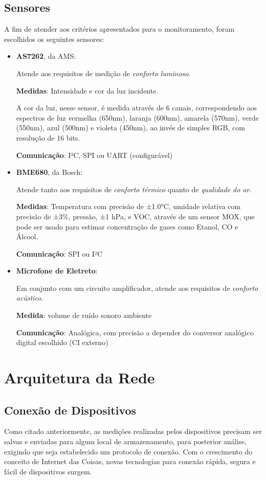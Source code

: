\documentclass[monografia.tex]{subfiles}
\begin{document}
\subsection{Sensores}
A fim de atender aos critérios apresentados para o monitoramento, foram escolhidos os seguintes sensores: 
\begin{itemize}
\item \textbf{AS7262}, da AMS: 

Atende aos requisitos de medição de \textit{conforto luminoso}. 

\textbf{Medidas}: Intensidade e cor da luz incidente.

A cor da luz, nesse sensor, é medida através de 6 canais, correspondendo aos espectros de luz vermelha (650nm), laranja (600nm), amarela (570nm), verde (550nm), azul (500nm) e violeta (450nm), ao invés de simples RGB, com resolução de 16 bits.

\textbf{Comunicação}: I²C, SPI ou UART (configurável)

\item \textbf{BME680}, da Bosch: 

Atende tanto aos requisitos de \textit{conforto térmico} quanto de \textit{qualidade do ar}.

\textbf{Medidas}: Temperatura com precisão de ±1.0°C, umidade relativa com precisão de ±3\%, pressão, ±1 hPa, e VOC, através de um sensor MOX, que pode ser usado para estimar concentração de gases como Etanol, CO e Álcool. 

\textbf{Comunicação}: SPI ou I²C

\item \textbf{Microfone de Eletreto}:

Em conjunto com um circuito amplificador, atende aos requisitos de \textit{conforto acústico}. 

\textbf{Medida}: volume de ruído sonoro ambiente

\textbf{Comunicação}: Analógica, com precisão a depender do conversor analógico digital escolhido (CI externo)
\end{itemize}

\section{Arquitetura da Rede}

\subsection{Conexão de Dispositivos}
Como citado anteriormente, as medições realizadas pelos dispositivos precisam ser salvas e enviadas para algum local de armazenamento, para posterior análise, exigindo que seja estabelecido um protocolo de conexão. Com o crescimento do conceito de Internet das Coisas, novas tecnologias para conexão rápida, segura e fácil de dispositivos surgem.
\end{document}
